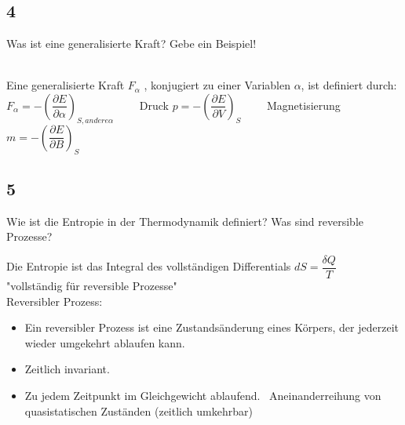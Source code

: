 \subsection{4}
\begin{myfrag}
Was ist eine generalisierte Kraft? Gebe ein Beispiel!
\end{myfrag} \quad \\
Eine generalisierte Kraft $F_\alpha$ , konjugiert zu einer Variablen $\alpha$, ist definiert durch: \\[2ex]
$F_\alpha = - \left( \dfrac{\partial E}{\partial \alpha} \right) _{S,andere \alpha}\qquad $ Druck
$p = -\left(\dfrac{\partial E}{\partial V} \right) _S \qquad
$ Magnetisierung
$m= -\left(\dfrac{\partial E}{\partial B} \right) _S $
\subsection{5}
\begin{myfrag}
Wie ist die Entropie in der Thermodynamik definiert? Was sind
reversible Prozesse?
\end{myfrag}
Die Entropie ist das Integral des vollständigen Differentials $dS = \dfrac{\delta Q}{T}$ \\"vollständig für reversible Prozesse" \\[2ex]
Reversibler Prozess:
\begin{itemize}
\item Ein reversibler Prozess ist eine Zustandsänderung eines Körpers, der jederzeit wieder umgekehrt ablaufen kann.
\item Zeitlich invariant. 
\item Zu jedem Zeitpunkt im Gleichgewicht ablaufend.
\ Aneinanderreihung von quasistatischen Zuständen (zeitlich umkehrbar)
\end{itemize} 


